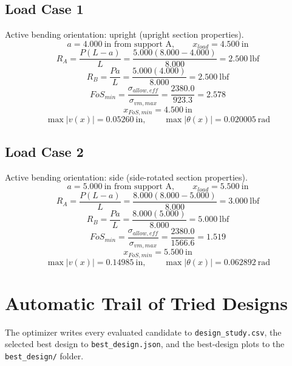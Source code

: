 \documentclass[11pt]{article}
\begin{document}
\subsection*{Load Case 1}
Active bending orientation: upright (upright section properties).
\[a = 4.000\ \mathrm{in} \text{ from support A}, \qquad x_{load} = 4.500\ \mathrm{in}\]
\[R_A = \frac{P(L-a)}{L} = \frac{5.000(8.000-4.000)}{8.000} = 2.500\ \mathrm{lbf}\]
\[R_B = \frac{Pa}{L} = \frac{5.000(4.000)}{8.000} = 2.500\ \mathrm{lbf}\]
\[FoS_{min} = \frac{\sigma_{allow,eff}}{\sigma_{vm,max}} = \frac{2380.0}{923.3} = 2.578\]
\[x_{FoS,min} = 4.500\ \mathrm{in}\]
\[\max |v(x)| = 0.05260\ \mathrm{in}, \qquad \max |\theta(x)| = 0.020005\ \mathrm{rad}\]
\subsection*{Load Case 2}
Active bending orientation: side (side-rotated section properties).
\[a = 5.000\ \mathrm{in} \text{ from support A}, \qquad x_{load} = 5.500\ \mathrm{in}\]
\[R_A = \frac{P(L-a)}{L} = \frac{8.000(8.000-5.000)}{8.000} = 3.000\ \mathrm{lbf}\]
\[R_B = \frac{Pa}{L} = \frac{8.000(5.000)}{8.000} = 5.000\ \mathrm{lbf}\]
\[FoS_{min} = \frac{\sigma_{allow,eff}}{\sigma_{vm,max}} = \frac{2380.0}{1566.6} = 1.519\]
\[x_{FoS,min} = 5.500\ \mathrm{in}\]
\[\max |v(x)| = 0.14985\ \mathrm{in}, \qquad \max |\theta(x)| = 0.062892\ \mathrm{rad}\]

\section*{Automatic Trail of Tried Designs}
The optimizer writes every evaluated candidate to \texttt{design\_study.csv}, the selected best design to \texttt{best\_design.json}, and the best-design plots to the \texttt{best\_design/} folder.
\end{document}
